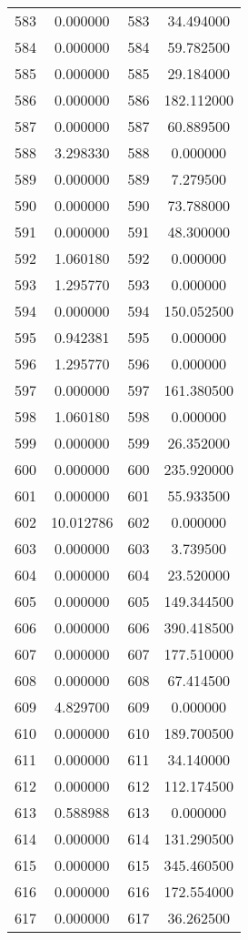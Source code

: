 \documentclass[12pt]{article}
\begin{document}
\begin{longtable}{@{}cccc@{}}
583 & 0.000000 & 583 & 34.494000 \\
584 & 0.000000 & 584 & 59.782500 \\
585 & 0.000000 & 585 & 29.184000 \\
586 & 0.000000 & 586 & 182.112000 \\
587 & 0.000000 & 587 & 60.889500 \\
588 & 3.298330 & 588 & 0.000000 \\
589 & 0.000000 & 589 & 7.279500 \\
590 & 0.000000 & 590 & 73.788000 \\
591 & 0.000000 & 591 & 48.300000 \\
592 & 1.060180 & 592 & 0.000000 \\
593 & 1.295770 & 593 & 0.000000 \\
594 & 0.000000 & 594 & 150.052500 \\
595 & 0.942381 & 595 & 0.000000 \\
596 & 1.295770 & 596 & 0.000000 \\
597 & 0.000000 & 597 & 161.380500 \\
598 & 1.060180 & 598 & 0.000000 \\
599 & 0.000000 & 599 & 26.352000 \\
600 & 0.000000 & 600 & 235.920000 \\
601 & 0.000000 & 601 & 55.933500 \\
602 & 10.012786 & 602 & 0.000000 \\
603 & 0.000000 & 603 & 3.739500 \\
604 & 0.000000 & 604 & 23.520000 \\
605 & 0.000000 & 605 & 149.344500 \\
606 & 0.000000 & 606 & 390.418500 \\
607 & 0.000000 & 607 & 177.510000 \\
608 & 0.000000 & 608 & 67.414500 \\
609 & 4.829700 & 609 & 0.000000 \\
610 & 0.000000 & 610 & 189.700500 \\
611 & 0.000000 & 611 & 34.140000 \\
612 & 0.000000 & 612 & 112.174500 \\
613 & 0.588988 & 613 & 0.000000 \\
614 & 0.000000 & 614 & 131.290500 \\
615 & 0.000000 & 615 & 345.460500 \\
616 & 0.000000 & 616 & 172.554000 \\
617 & 0.000000 & 617 & 36.262500 \\

\end{longtable}
\end{document}
